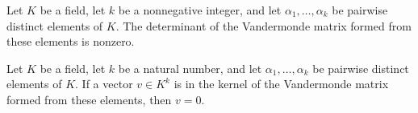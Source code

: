 \begin{theorem}
\label{FABL.det_vandermonde_ne_zero_of_injective}
\leanok
{}
Let $K$ be a field, let $k$ be a nonnegative integer, and let $\alpha_1,\ldots,\alpha_k$
be pairwise distinct elements of $K$. The determinant of the Vandermonde matrix formed
from these elements is nonzero.
\end{theorem}

\begin{theorem}
\label{FABL.eq_zero_of_vandermonde_mulVec_eq_zero}
\leanok
{}
Let $K$ be a field, let $k$ be a natural number, and let $\alpha_1,\ldots,\alpha_k$ be
pairwise distinct elements of $K$. If a vector $v\in K^k$ is in the kernel of the
Vandermonde matrix formed from these elements, then $v=0$.
\end{theorem}
